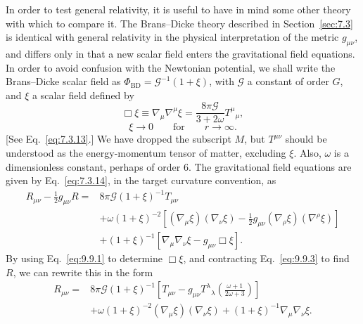 In order to test general relativity, it is useful to have in mind some
other theory with which to compare it. The Brans--Dicke theory described in
Section~\ref{sec:7.3} is identical with general relativity in the physical
interpretation of the metric \(g_{\mu\nu}\), and differs only in that a new
scalar field enters the gravitational field equations. In order to avoid
confusion with the Newtonian potential, we shall write the Brans--Dicke
scalar field as
\(\Phi_{\mathrm{BD}}=\mathcal G^{-1}(1+\xi)\), with \(\mathcal G\) a
constant of order \(G\), and \(\xi\) a scalar field defined by
\begin{equation}
  \Box\xi
  \equiv
  \nabla_\mu\nabla^\mu\xi
  =
  \frac{8\pi\mathcal G}{3+2\omega}T^\mu{}_\mu,
  \tag{9.9.1}\label{eq:9.9.1}
\end{equation}
\begin{equation}
  \xi\longrightarrow0
  \qquad\text{for}\qquad r\longrightarrow\infty.
  \tag{9.9.2}\label{eq:9.9.2}
\end{equation}
[See Eq.~\eqref{eq:7.3.13}.] We have dropped the subscript \(M\), but
\(T^{\mu\nu}\) should be understood as the energy-momentum tensor of
matter, excluding \(\xi\). Also, \(\omega\) is a dimensionless constant,
perhaps of order 6. The gravitational field equations are given by
Eq.~\eqref{eq:7.3.14}, in the target curvature convention, as
\begin{equation}
  \begin{split}
  R_{\mu\nu}-\frac12g_{\mu\nu}R
  ={}&
  8\pi\mathcal G(1+\xi)^{-1}T_{\mu\nu}\\
  &+\omega(1+\xi)^{-2}
  \left[
    (\nabla_\mu\xi)(\nabla_\nu\xi)
    -\frac12g_{\mu\nu}(\nabla_\rho\xi)(\nabla^\rho\xi)
  \right]\\
  &+(1+\xi)^{-1}
  \left[
    \nabla_\mu\nabla_\nu\xi-g_{\mu\nu}\Box\xi
  \right].
  \end{split}
  \tag{9.9.3}\label{eq:9.9.3}
\end{equation}
By using Eq.~\eqref{eq:9.9.1} to determine \(\Box\xi\), and contracting
Eq.~\eqref{eq:9.9.3} to find \(R\), we can rewrite this in the form
\begin{equation}
  \begin{split}
  R_{\mu\nu}={}&
  8\pi\mathcal G(1+\xi)^{-1}
  \left[
    T_{\mu\nu}
    -g_{\mu\nu}T^\lambda{}_\lambda
     \left(\frac{\omega+1}{2\omega+3}\right)
  \right]\\
  &+\omega(1+\xi)^{-2}
    (\nabla_\mu\xi)(\nabla_\nu\xi)
  +(1+\xi)^{-1}\nabla_\mu\nabla_\nu\xi.
  \end{split}
  \tag{9.9.4}\label{eq:9.9.4}
\end{equation}

